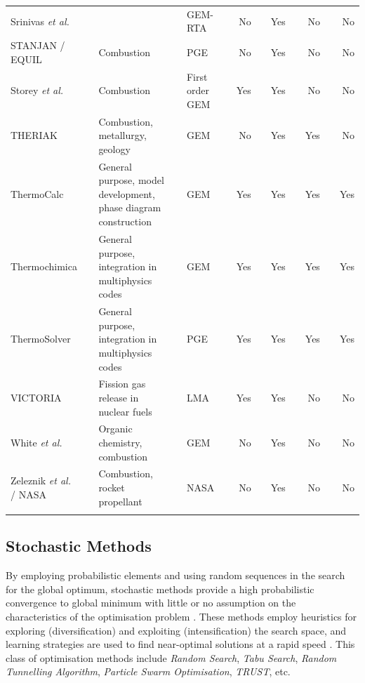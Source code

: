 \begin{landscape}
\begin{longtable}{@{}p{}cp{}clcrcrcrcr@{}}
		Srinivas \textit{et al.} \cite{Srinivas06} && {} && GEM-RTA && No && Yes && No && No\\
		STANJAN / EQUIL \cite{Reynolds86} && {Combustion} && PGE && No && Yes && No && No\\
		Storey \textit{et al.} \cite{Storey:1964aa} && {Combustion} && First order GEM && Yes && Yes && No && No\\
		THERIAK \cite{DECAPITANI19872639} && {Combustion, metallurgy, geology} && GEM && No && Yes && Yes && No\\
		ThermoCalc \cite{ANDERSSON2002273} && {General purpose, model development, phase diagram construction} && GEM && Yes && Yes && Yes && Yes\\
		Thermochimica \cite{Piro13} && {General purpose, integration in multiphysics codes} && GEM && Yes && Yes && Yes && Yes\\
		ThermoSolver \cite{Piro11b} && {General purpose, integration in multiphysics codes} && PGE && Yes && Yes && Yes && Yes\\
		VICTORIA \cite{Heams:1992aa} && {Fission gas release in nuclear fuels} && LMA && Yes && Yes && No && No\\
		White \textit{et al.} \cite{White58a} && {Organic chemistry, combustion} && GEM && No && Yes && No && No\\
		Zeleznik \textit{et al.} / NASA \cite{Zeleznik:1968aa} && {Combustion, rocket propellant} && NASA && No && Yes && No && No\\
		\bottomrule
		\label{tab:gemreview}
	\end{longtable}
\end{landscape}
\restoregeometry

	
	\subsection{Stochastic Methods}
	By employing probabilistic elements and using random sequences in the search for the global optimum, stochastic methods  provide a high probabilistic convergence to global minimum with little or no assumption on the characteristics of the optimisation problem \cite{Rangaiah:2010aa}. These methods employ heuristics for exploring (diversification) and exploiting (intensification) the search space, and learning strategies are used to find near-optimal solutions at a rapid speed \cite{Blum:2003aa}. This class of optimisation methods include \emph{Random Search}, \emph{Tabu Search}, \emph{Random Tunnelling Algorithm}, \emph{Particle Swarm Optimisation}, \emph{TRUST}, etc. 
	

